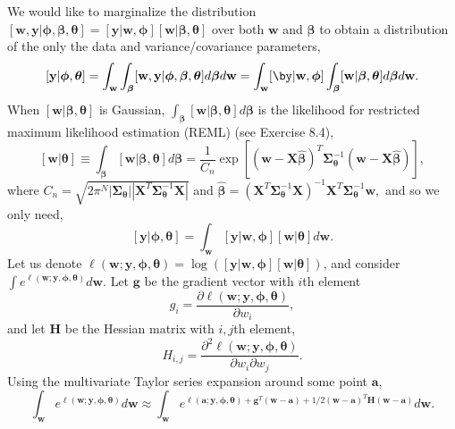 \documentclass[12pt, titlepage]{article}
\begin{document}
We would like to marginalize the distribution $[\mathbf{w}, \mathbf{y}|\boldsymbol{\phi},\boldsymbol{\beta},\boldsymbol{\theta}] = [\mathbf{y}|\mathbf{w},\boldsymbol{\phi}][\mathbf{w}|\boldsymbol{\beta},\boldsymbol{\theta}]$ over both $\mathbf{w}$ and $\boldsymbol{\beta}$ to obtain a distribution of the only the data and variance/covariance parameters,
$$
	[\mathbf{y}|\boldsymbol{\phi},\boldsymbol{\theta}] = \int_\mathbf{w} \int_{\boldsymbol{\beta}} [\mathbf{w}, \mathbf{y}|\boldsymbol{\phi},\boldsymbol{\beta},\boldsymbol{\theta}] d\boldsymbol{\beta} d\mathbf{w} =
		\int_\mathbf{w}  [\by|\mathbf{w},\boldsymbol{\phi}] \int_{\boldsymbol{\beta}} [\mathbf{w}|\boldsymbol{\beta},\boldsymbol{\theta}] d\boldsymbol{\beta} d\mathbf{w}.
$$
When $[\mathbf{w}|\boldsymbol{\beta},\boldsymbol{\theta}]$ is Gaussian, $\int_{\boldsymbol{\beta}} [\mathbf{w}|\boldsymbol{\beta},\boldsymbol{\theta}] d\boldsymbol{\beta}$ is the likelihood for restricted maximum likelihood estimation (REML) (see Exercise 8.4),
$$
[\mathbf{w}|\boldsymbol{\theta}] \equiv \int_{\boldsymbol{\beta}} [\mathbf{w}|\boldsymbol{\beta},\boldsymbol{\theta}] d\boldsymbol{\beta} = 
\frac{1}{C_n}\exp[(\mathbf{w} - \mathbf{X}\hat{\boldsymbol{\beta}})^{T}\boldsymbol{\Sigma}_{\boldsymbol{\theta}}^{-1}(\mathbf{w} - \mathbf{X}\hat{\boldsymbol{\beta}})],
$$
where $C_n = \sqrt{2\pi^N|\boldsymbol{\Sigma}_{\boldsymbol{\theta}}||\mathbf{X}^{T}\boldsymbol{\Sigma}_{\boldsymbol{\theta}}^{-1}\mathbf{X}|}$ and 
$\hat{\boldsymbol{\beta}} = (\mathbf{X}^{T}\boldsymbol{\Sigma}_{\boldsymbol{\theta}}^{-1}\mathbf{X})^{-1}\mathbf{X}^{T}\boldsymbol{\Sigma}_{\boldsymbol{\theta}}^{-1}\mathbf{w},$
and so we only need,
$$
	[\mathbf{y}| \boldsymbol{\phi},\boldsymbol{\theta}] = \int_\mathbf{w}  [\mathbf{y}|\mathbf{w},\boldsymbol{\phi}][\mathbf{w}|\boldsymbol{\theta}]d\mathbf{w}.
$$
Let us denote $\ell(\mathbf{w};\mathbf{y},\boldsymbol{\phi},\boldsymbol{\theta}) = \log([\mathbf{y}|\mathbf{w},\boldsymbol{\phi}][\mathbf{w}|\boldsymbol{\theta}])$, and consider $\int e^{\ell(\mathbf{w};\mathbf{y},\boldsymbol{\phi},\boldsymbol{\theta})} d\mathbf{w}$. Let $\mathbf{g}$ be the gradient vector with $i$th element
$$
g_{i} = \frac{\partial \ell(\mathbf{w};\mathbf{y},\boldsymbol{\phi},\boldsymbol{\theta})}{\partial w_i},
$$
and let $\mathbf{H}$ be the Hessian matrix with $i,j$th element,
$$
H_{i,j} = \frac{\partial^2 \ell(\mathbf{w};\mathbf{y},\boldsymbol{\phi},\boldsymbol{\theta})}{\partial w_i\partial w_j}.
$$
Using the multivariate Taylor series expansion around some point $\mathbf{a}$,
$$
\int_\mathbf{w} e^{\ell(\mathbf{w};\mathbf{y},\boldsymbol{\phi},\boldsymbol{\theta})} d\mathbf{w} \approx \int_\mathbf{w} e^{\ell(\mathbf{a};\mathbf{y},\boldsymbol{\phi},\boldsymbol{\theta}) + \mathbf{g}^{T}(\mathbf{w} -\mathbf{a}) + 1/2(\mathbf{w} - \mathbf{a})^{T}\mathbf{H}(\mathbf{w} - \mathbf{a})} d\mathbf{w}.
$$
\end{document}
